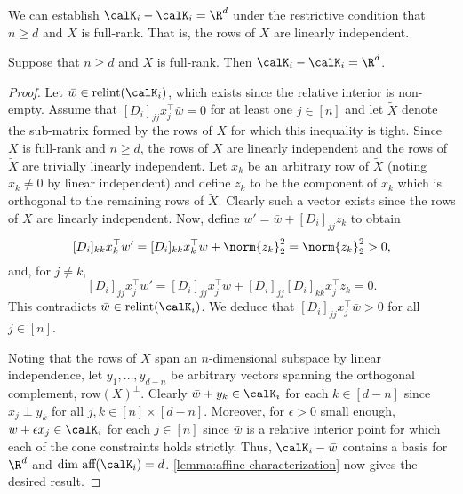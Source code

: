 \documentclass{article}
\begin{document}
We can establish \( \calK_i - \calK_i = \R^d \) under the restrictive condition that \( n \geq d \) and \( X \) is full-rank.
That is, the rows of \( X \) are linearly independent.
\begin{proposition}
	Suppose that \( n \geq d \) and \( X \) is full-rank.
	Then \( \calK_i - \calK_i = \R^d \).
\end{proposition}
\begin{proof}
	Let \( \bar w \in \text{relint} (\calK_i) \), which exists since the relative interior is non-empty.
	Assume that \( [D_i]_{jj} x_j^\top \bar w = 0 \) for at least one \( j \in [n] \) and let \( \tilde X \) denote the sub-matrix formed by the rows of \( X \) for which this inequality is tight.
	Since \( X \) is full-rank and \( n \geq d \), the rows of \( X \) are linearly independent and the rows of \( \tilde X \) are trivially linearly independent.
	Let \( x_k \) be an arbitrary row of \( \tilde X \) (noting \( x_k \neq 0 \) by linear independent) and define \( z_k \) to be the component of \( x_k \) which is orthogonal to the remaining rows of \( \tilde X \).
	Clearly such a vector exists since the rows of \( \tilde X \) are linearly independent.
	Now, define \( w' = \bar w + [D_i]_{jj} z_k \) to obtain
	\[
		[D_i]_{kk} x_k^\top w' = [D_i]_{kk} x_k^\top \bar w + \norm{z_k}_2^2 = \norm{z_k}_2^2 > 0,
	\]
	and, for \( j \neq k \),
	\[
		[D_i]_{jj} x_j^\top w' = [D_i]_{jj} x_{j}^\top \bar w +  [D_i]_{jj} [D_i]_{kk} x_{j}^\top z_k = 0.
	\]
	This contradicts \( \bar w \in \text{relint} (\calK_i) \).
	We deduce that \( [D_i]_{jj} x_j^\top \bar w > 0 \) for all \( j \in [n] \).

	Noting that the rows of \( X \) span an \( n \)-dimensional subspace by linear independence,
	let \( y_{1}, \ldots, y_{d-n} \) be arbitrary vectors spanning the orthogonal complement, \( \text{row}(X)^\perp \).
	Clearly \( \bar w + y_{k} \in \calK_i \) for each \( k \in [d-n] \) since \( x_j \perp y_k \) for all \( j, k \in [n] \times [d-n] \).
	Moreover, for \( \epsilon > 0 \) small enough, \( \bar w + \epsilon x_{j} \in \calK_i \) for each \( j \in [n] \) since \( \bar w \) is a relative interior point for which each of the cone constraints holds strictly.
    Thus, \( \calK_i - \bar w\) contains a basis for \( \R^d \) and \( \text{dim aff} (\calK_i) = d \).
	\autoref{lemma:affine-characterization} now gives the desired result.

\end{proof}

\printbibliography[]
\end{document}
